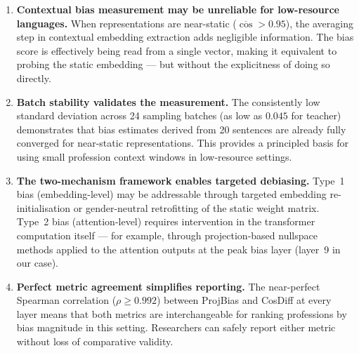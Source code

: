 \begin{enumerate}
  \item \textbf{Contextual bias measurement may be unreliable for low-resource
    languages.} When representations are near-static ($\overline{\cos} > 0.95$),
    the averaging step in contextual embedding extraction adds negligible
    information. The bias score is effectively being read from a single vector,
    making it equivalent to probing the static embedding — but without the
    explicitness of doing so directly.

  \item \textbf{Batch stability validates the measurement.} The consistently
    low standard deviation across 24 sampling batches (as low as $0.045$ for
    teacher) demonstrates that bias estimates derived from 20 sentences are
    already fully converged for near-static representations. This provides a
    principled basis for using small profession context windows in low-resource
    settings.

  \item \textbf{The two-mechanism framework enables targeted debiasing.}
    Type~1 bias (embedding-level) may be addressable through targeted
    embedding re-initialisation or gender-neutral retrofitting of the static
    weight matrix. Type~2 bias (attention-level) requires intervention in the
    transformer computation itself — for example, through projection-based
    nullspace methods applied to the attention outputs at the peak bias layer
    (layer~9 in our case).

  \item \textbf{Perfect metric agreement simplifies reporting.} The near-perfect
    Spearman correlation ($\rho \geq 0.992$) between ProjBias and CosDiff at
    every layer means that both metrics are interchangeable for ranking
    professions by bias magnitude in this setting. Researchers can safely
    report either metric without loss of comparative validity.
\end{enumerate}

